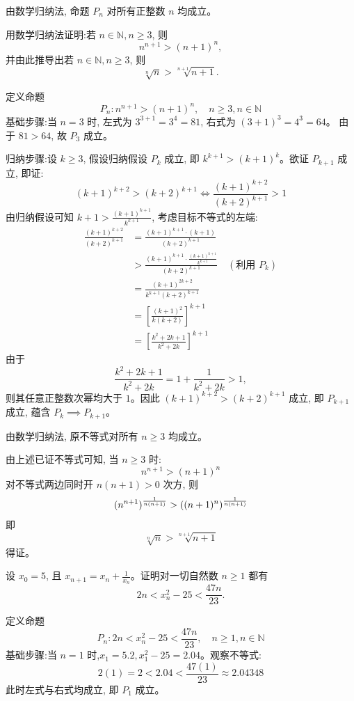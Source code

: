 \begin{questions}
\begin{solution}
        由数学归纳法, 命题 $P_n$ 对所有正整数 $n$ 均成立。
    \end{solution}

    \question 用数学归纳法证明:若 $n \in \mathbb{N}, n \geq 3$, 则
    \[
    n^{n+1} > (n+1)^n,
    \]
    并由此推导出若 $n \in \mathbb{N}, n \geq 3$, 则
    \[
    \sqrt[n]{n} > \sqrt[n+1]{n+1}.
    \]
    \begin{solution}
        定义命题 
        \[
        P_n:n^{n+1} > (n+1)^n, \quad n \ge 3,n \in \mathbb{N}
        \]
        基础步骤:当 $n=3$ 时, 
        左式为 $3^{3+1} = 3^4 = 81$, 右式为 $(3+1)^3 = 4^3 = 64$。
        由于 $81 > 64$, 故 $P_3$ 成立。

        归纳步骤:设 $k \ge 3$, 假设归纳假设 $P_k$ 成立, 即 $k^{k+1} > (k+1)^k$。欲证 $P_{k+1}$ 成立, 即证:
        \[
        (k+1)^{k+2} > (k+2)^{k+1} \iff \frac{(k+1)^{k+2}}{(k+2)^{k+1}} > 1
        \]
        由归纳假设可知 $k+1 > \frac{(k+1)^{k+1}}{k^{k+1}}$, 考虑目标不等式的左端:
        \begin{align}
        \frac{(k+1)^{k+2}}{(k+2)^{k+1}} &= \frac{(k+1)^{k+1} \cdot (k+1)}{(k+2)^{k+1}} \\
        &> \frac{(k+1)^{k+1} \cdot \frac{(k+1)^{k+1}}{k^{k+1}}}{(k+2)^{k+1}} \quad (\text{利用 } P_k) \\
        &= \frac{(k+1)^{2k+2}}{k^{k+1}(k+2)^{k+1}} \\
        &= \left[ \frac{(k+1)^2}{k(k+2)} \right]^{k+1} \\
        &= \left[ \frac{k^2+2k+1}{k^2+2k} \right]^{k+1}
        \end{align}
        由于 
        \[
        \frac{k^2+2k+1}{k^2+2k} = 1 + \frac{1}{k^2+2k} > 1, 
        \]
        则其任意正整数次幂均大于 $1$。因此 $(k+1)^{k+2} > (k+2)^{k+1}$ 成立, 即 $P_{k+1}$ 成立, 蕴含 $P_k \implies P_{k+1}$。

        由数学归纳法, 原不等式对所有 $n \ge 3$ 均成立。
        
        由上述已证不等式可知, 当 $n \ge 3$ 时:
        \[
        n^{n+1} > (n+1)^n
        \]
        对不等式两边同时开 $n(n+1)>0$ 次方, 则
        \[
        (n^{n+1})^{\frac{1}{n(n+1)}} > ((n+1)^n)^{\frac{1}{n(n+1)}} \\
        \]
        即
        \[
        \sqrt[n]{n} > \sqrt[n+1]{n+1}
        \]
        得证。
    \end{solution}

    \question 设 $x_0=5$, 且 $x_{n+1}=x_n+\frac{1}{x_n}$。证明对一切自然数 $n \ge 1$ 都有
    \[
    2n < x_n^2 - 25 < \frac{47n}{23}.
    \]
    \begin{solution}
        定义命题 
        \[
        P_n:2n < x_n^2 - 25 < \frac{47n}{23}, \quad n \ge 1,n \in \mathbb{N}
        \]
        基础步骤:当 $n=1$ 时,$x_1 = 5.2, x_1^2 - 25 = 2.04$。观察不等式:
        \[
        2(1) = 2 < 2.04 < \frac{47(1)}{23} \approx 2.04348
        \]
        此时左式与右式均成立, 即 $P_1$ 成立。


\end{solution}
\end{questions}
